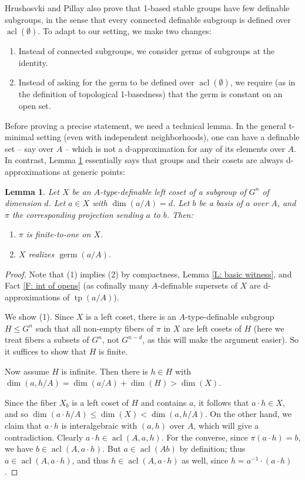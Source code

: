 \documentclass{amsart}
\newtheorem{lemma}[theorem]{Lemma}
\theoremstyle{definition}
\newcommand{\acl}{\operatorname{acl}}
\newcommand{\tp}{\operatorname{tp}}
\begin{document}
Hrushosvki and Pillay also prove that 1-based stable groups have few definable subgroups, in the sense that every connected definable subgroup is defined over $\operatorname{acl}(\emptyset)$. To adapt to our setting, we make two changes:

\begin{enumerate}
    \item Instead of connected subgroups, we consider germs of subgroups at the identity.
    \item Instead of asking for the germ to be defined over $\acl(\emptyset)$, we require (as in the definition of topological 1-basedness) that the germ is constant on an open set.
\end{enumerate}

Before proving a precise statement, we need a technical lemma. In the general t-minimal setting (even with independent neighborhoods), one can have a definable set -- say over $A$ -- which is not a d-approximation for any of its elements over $A$. In contrast, Lemma \ref{L: projections of cosets} essentially says that groups and their cosets are always d-approximations at generic points:

\begin{lemma} \label{L: projections of cosets}
Let $X$ be an $A$-type-definable left coset of a subgroup of $G^n$ of dimension $d$. Let $a\in X$ with $\dim(a/A)=d$. Let $b$ be a basis of $a$ over $A$, and $\pi$ the corresponding projection sending $a$ to $b$. Then:
\begin{enumerate}
    \item $\pi$ is finite-to-one on $X$.
    \item $X$ realizes $\operatorname{germ}(a/A)$.
\end{enumerate}
\end{lemma}
\begin{proof}
    Note that (1) implies (2) by compactness, Lemma \ref{L: basic witness}, and Fact \ref{F: int of opens} (as cofinally many $A$-definable supersets of $X$ are d-approximations of $\tp(a/A)$).
    
    We show (1). Since $X$ is a left coset, there is an $A$-type-definable subgroup $H\leq G^n$ such that all non-empty fibers of $\pi$ in $X$ are left cosets of $H$ (here we treat fibers a subsets of $G^n$, not $G^{n-d}$, as this will make the argument easier). So it suffices to show that $H$ is finite.
    
    Now assume $H$ is infinite. Then there is $h\in H$ with $\dim(a,h/A)=\dim(a/A)+\dim(H)>\dim(X)$.
    
    Since the fiber $X_b$ is a left coset of $H$ and contains $a$, it follows that $a\cdot h\in X$, and so $\dim(a\cdot h/A)\leq\dim(X)<\dim(a,h/A)$. On the other hand, we claim that $a\cdot h$ is interalgebraic with $(a,h)$ over $A$, which will give a contradiction. Clearly $a\cdot h\in\acl(A,a,h)$. For the converse, since $\pi(a\cdot h)=b$, we have $b\in\acl(A,a\cdot h)$. But $a\in\acl(Ab)$ by definition; thus $a\in\acl(A,a\cdot h)$, and thus $h\in\acl(A,a\cdot h)$ as well, since $h=a^{-1}\cdot(a\cdot h)$.
\end{proof}
\end{document}
